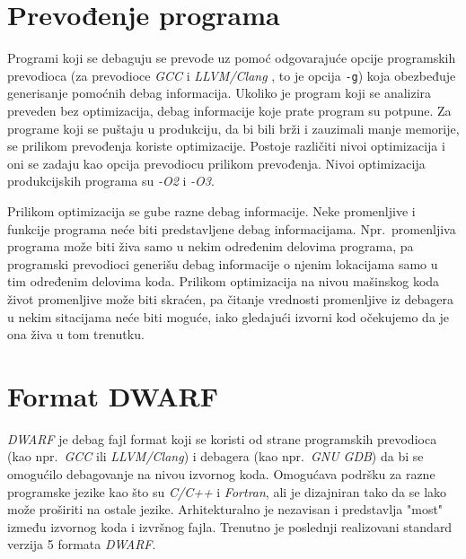 \documentclass[12pt,oneside]{memoir}
\begin{document}
\section{Prevođenje programa}

Programi koji se debaguju se prevode uz pomoć odgovarajuće opcije programskih prevodioca (za prevodioce \emph{GCC} \cite{GCC} i \emph{LLVM/Clang} \cite{LLVM}, to je opcija \texttt{-g}) koja obezbeđuje generisanje pomoćnih debag informacija. Ukoliko je program koji se analizira preveden bez optimizacija, debag informacije koje prate program su potpune. Za programe koji se puštaju u produkciju, da bi bili brži i zauzimali manje memorije, se prilikom prevođenja koriste optimizacije. Postoje različiti nivoi optimizacija i oni se zadaju kao opcija prevodiocu prilikom prevođenja. Nivoi optimizacija produkcijskih programa su \emph{-O2} i \emph{-O3}.

Prilikom optimizacija se gube razne debag informacije. Neke promenljive i funkcije programa neće biti predstavljene debag informacijama. Npr.~promenljiva programa može biti živa samo u nekim određenim delovima programa, pa programski prevodioci generišu debag informacije o njenim lokacijama samo u tim određenim delovima koda. Prilikom optimizacija na nivou mašinskog koda život promenljive može biti skraćen, pa čitanje vrednosti promenljive iz debagera u nekim sitacijama neće biti moguće, iako gledajući izvorni kod očekujemo da je ona živa u tom trenutku.
\newpage
\section{Format DWARF}

\emph{DWARF} je debag fajl format koji se koristi od strane programskih prevodioca (kao npr.~\emph{GCC} ili \emph{LLVM/Clang}) i debagera (kao npr.~\emph{GNU GDB}) da bi se omogućilo debagovanje na nivou izvornog koda. Omogućava podršku za razne programske jezike kao što su \emph{C/C++} i \emph{Fortran}, ali je dizajniran tako da se lako može proširiti na ostale jezike. Arhitekturalno je nezavisan i predstavlja "most" između izvornog koda i izvršnog fajla. Trenutno je poslednji realizovani standard verzija 5 formata \emph{DWARF}.
\end{document}
